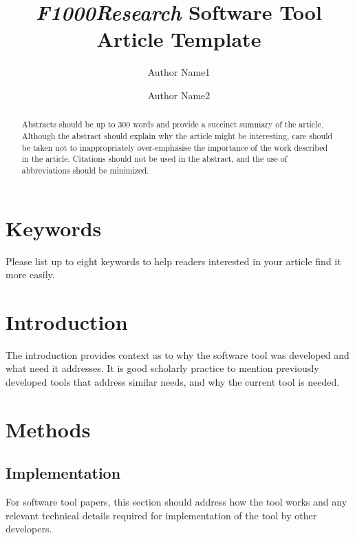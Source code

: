 \documentclass[9pt,a4paper,]{extarticle}
\begin{document}
\pagestyle{front}

\title{\emph{F1000Research} Software Tool Article Template}

\author[1]{Author Name1}
\author[2]{Author Name2}

\maketitle
\thispagestyle{front}

\begin{abstract}
Abstracts should be up to 300 words and provide a succinct summary of
the article. Although the abstract should explain why the article might
be interesting, care should be taken not to inappropriately
over-emphasise the importance of the work described in the article.
Citations should not be used in the abstract, and the use of
abbreviations should be minimized.
\end{abstract}

\section*{Keywords}
Please list up to eight keywords to help readers interested in your
article find it more easily.


\clearpage
\pagestyle{main}

\section{Introduction}\label{introduction}

The introduction provides context as to why the software tool was
developed and what need it addresses. It is good scholarly practice to
mention previously developed tools that address similar needs, and why
the current tool is needed.

\section{Methods}\label{methods}

\subsection{Implementation}\label{implementation}

For software tool papers, this section should address how the tool works
and any relevant technical details required for implementation of the
tool by other developers.
\end{document}
